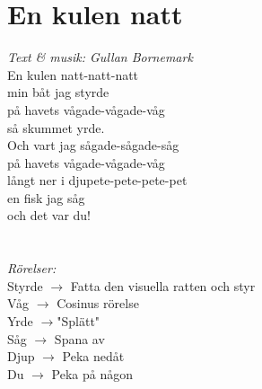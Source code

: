 \section{En kulen natt}
\textit{Text \& musik: Gullan Bornemark}
\vspace{2mm}\\
En kulen natt-natt-natt\\
min båt jag styrde\\
på havets vågade-vågade-våg\\
så skummet yrde.\\
Och vart jag sågade-sågade-såg\\
på havets vågade-vågade-våg\\
långt ner i djupete-pete-pete-pet\\
en fisk jag såg\\
och det var du!\\
\\
\\
\textit{Rörelser:}\\
Styrde $\rightarrow$ Fatta den visuella ratten och styr\\
Våg $\rightarrow$ Cosinus rörelse\\
Yrde $\rightarrow$"Splätt"\\
Såg $\rightarrow$ Spana av\\
Djup $\rightarrow$ Peka nedåt\\
Du $\rightarrow$ Peka på någon

\newpage
